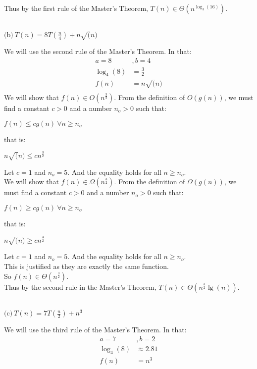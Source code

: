 \documentclass[12pt]{article}
\begin{document}
Thus by the first rule of the Master's Theorem, $T(n) \in \Theta( n^{ \log_3(16)})$.\\

\hrulefill \\

\centerline{$\text{(b)}\ T(n) = 8T(\frac{n}{4} ) + n\sqrt(n) $ } 
We will use the second rule of the Master's Theorem.  In that: \\
\begin{align*}
a  = 8 &,
 b  = 4   \\
 \log_4(8) & = \frac{3}{2} \\
f(n) & = n\sqrt(n) \\
\end{align*}
We will show that $f(n) \in O(n^{\frac{3}{2}})$.
From the definition of $O(g(n))$, we must find a constant $c >0$ and a number $n_o >0$ such that: \\
\centerline{$ f(n) \leq c g(n) ~ \forall n \geq n_o$ }
that is: \\
\centerline{ $n\sqrt(n) \leq c n^{ \frac{3}{2} }$ }
 Let $c = 1$ and $n_o = 5$.  And the equality holds for all $n \geq n_o$. \\

We will show that $f(n) \in \Omega(n^{\frac{3}{2}})$.
From the definition of $\Omega(g(n))$, we must find a constant $c >0$ and a number $n_o >0$ such that: \\
\centerline{$ f(n) \geq c g(n) ~ \forall n \geq n_o$ }
that is: \\
\centerline{ $n\sqrt(n) \geq c n^{\frac{3}{2}}$}
 Let $c = 1$ and $n_o = 5$.  And the equality holds for all $n \geq n_o$. \\
This is justified as they are exactly the same function.\\
So $f(n) \in \Theta( n^{\frac{3}{2}})$.\\

Thus by the second rule in the Master's Theorem, $T(n) \in \Theta( n^{\frac{3}{2}} \lg(n))$. \\

\hrulefill \\

\centerline{ $ \text{(c)}\ T(n)  = 7T(\frac{n}{2} ) + n^{3}$ }
We will use the third rule of the Master's Theorem.  In that: \\
\begin{align*}
a  = 7 &,
 b  = 2   \\
 \log_4(8) & \approx 2.81 \\
f(n) & = n^{3} \\
\end{align*}
\end{document}
